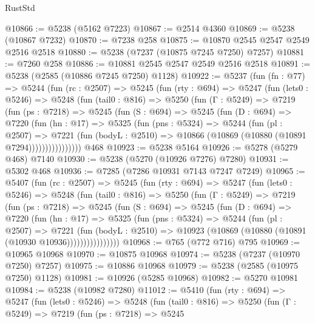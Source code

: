 \begin{lexlean}{RustStd}
\begin{coremodule}
@10866 := @5238 (@5162 @7223)
@10867 := @2514 @4360
@10869 := @5238 (@10867 @7232)
@10870 := @7238 @258
@10875 := @10870 @2545 @2547 @2549 @2516 @2518
@10880 := @5238 (@7237 (@10875 @7245 @7250) @7257)
@10881 := @7260 @258
@10886 := @10881 @2545 @2547 @2549 @2516 @2518
@10891 := @5238 (@2585 (@10886 @7245 @7250) @1128)
@10922 := @5237
    (fun (fn : @77) =>
    @5244
      (fun (rc : @2507) =>
      @5245
        (fun (rty : @694) =>
        @5247
          (fun (lets0 : @5246) =>
          @5248
            (fun (tail0 : @816) =>
            @5250
              (fun (Γ : @5249) =>
              @7219
                (fun (ps : @7218) =>
                @5245
                  (fun (S : @694) =>
                  @5245
                    (fun (D : @694) =>
                    @7220
                      (fun (hn : @17) =>
                      @5325
                        (fun (pns : @5324) =>
                        @5244
                          (fun (pl : @2507) =>
                          @7221
                            (fun (bodyL : @2510) =>
                            @10866 (@10869 (@10880 (@10891 @7294))))))))))))))))
    @468
@10923 := @5238 @5164
@10926 := @5278 (@5279 @468) @7140
@10930 := @5238 (@5270 (@10926 @7276) @7280)
@10931 := @5302 @468
@10936 := @7285 (@7286 @10931 @7143 @7247 @7249)
@10965 := @5407
    (fun (rc : @2507) =>
    @5245
      (fun (rty : @694) =>
      @5247
        (fun (lets0 : @5246) =>
        @5248
          (fun (tail0 : @816) =>
          @5250
            (fun (Γ : @5249) =>
            @7219
              (fun (ps : @7218) =>
              @5245
                (fun (S : @694) =>
                @5245
                  (fun (D : @694) =>
                  @7220
                    (fun (hn : @17) =>
                    @5325
                      (fun (pns : @5324) =>
                      @5244
                        (fun (pl : @2507) =>
                        @7221
                          (fun (bodyL : @2510) =>
                          @10923 (@10869 (@10880 (@10891 (@10930 @10936))))))))))))))))
@10968 := @765 (@772 @716) @795
@10969 := @10965 @10968
@10970 := @10875 @10968
@10974 := @5238 (@7237 (@10970 @7250) @7257)
@10975 := @10886 @10968
@10979 := @5238 (@2585 (@10975 @7250) @1128)
@10981 := @10926 (@5285 @10968)
@10982 := @5270 @10981
@10984 := @5238 (@10982 @7280)
@11012 := @5410
    (fun (rty : @694) =>
    @5247
      (fun (lets0 : @5246) =>
      @5248
        (fun (tail0 : @816) =>
        @5250
          (fun (Γ : @5249) =>
          @7219
            (fun (ps : @7218) =>
            @5245

\end{coremodule}
\end{lexlean}
